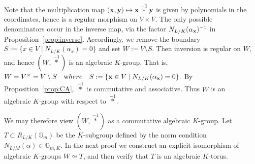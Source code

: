 \documentclass[a4paper, 11pt]{amsart}
\newcommand{\Gm}{{\mathbb G}_m}
\theoremstyle{plain}
\theoremstyle{definition}
\numberwithin{equation}{section}
\begin{document}
Note that the multiplication map $({\bf x},{\bf y})\mapsto {\bf x}\overset{-1}{\ast}{\bf y}$ is given by polynomials in the coordinates, hence is a regular morphism on $V\times V$. 
The only possible denominators occur in the inverse map, via the factor $N_{L/K}(\alpha_{\bf x})^{-1}$ in Proposition~\ref{prop:inverse}. 
Accordingly, we remove the boundary $S:=\{x\in V \mid N_{L/K}(\alpha_x)=0\}$
and set $W:=V\setminus S$.
Then inversion is regular on $W$, and hence $(W,\overset{-1}{\ast})$ is an algebraic $K$-group.
That is, $W=V^\times=V\setminus S\quad {\text where}\quad S:=\{{\bf x}\in V \mid N_{L/K}(\alpha_{\bf x})=0\}$.
By Proposition~\ref{prop:CA}, $\overset{-1}{\ast}$ is commutative and associative.
Thus $W$ is an algebraic $K$-group with respect to $\overset{-1}{\ast}$.

We may therefore view $(W,\overset{-1}{\ast})$ as a commutative algebraic $K$-group. 
Let $T\subset R_{L/K}(\Gm)$ be the $K$-subgroup defined by the norm condition $N_{L/M}(\alpha)\in {\mathbb G}_{m,K}$. 
In the next proof we construct an explicit isomorphism of algebraic $K$-groups $W\simeq T$, and then verify that $T$ is an algebraic $K$-torus.
\end{document}
